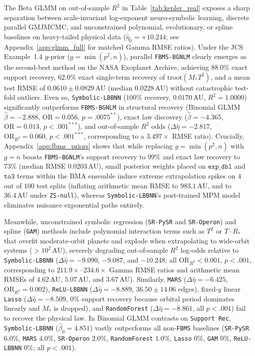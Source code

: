 \documentclass[11pt,a4paper]{article}
\begin{document}
The Beta GLMM on out-of-sample $R^2$ in Table~\ref{tab:kepler_real} exposes a sharp separation between scale-invariant log-exponent neuro-symbolic learning, discrete parallel GMJMCMC, and unconstrained polynomial, evolutionary, or spline baselines on heavy-tailed physical data ($\hat{\eta}_0 = +10.244$; see Appendix~\ref{app:glmm_full} for matched Gamma RMSE ratios). Under the JCS Example~1.4 $g$-prior ($g = \min(p^2, n)$), parallel \texttt{FBMS-BGNLM} clearly emerges as the second-best method on the NASA Exoplanet Archive, achieving $88.0\%$ exact support recovery, $62.0\%$ exact single-term recovery of $\mathrm{troot}(M_* T^2)$, and a mean test RMSE of $0.0610 \pm 0.0829\,\text{AU}$ (median $0.0228\,\text{AU}$) without catastrophic test-fold outliers. Even so, \texttt{Symbolic-LBBNN} ($100\%$ recovery, $0.0170\,\text{AU}$, $R^2 = 1.0000$) significantly outperforms \texttt{FBMS-BGNLM} in structural recovery (Binomial GLMM $\hat{\beta} = -2.888$, $\mathrm{OR} = 0.056$, $p = .0075^{**}$), exact law discovery ($\hat{\beta} = -4.365$, $\mathrm{OR} = 0.013$, $p < .001^{***}$), and out-of-sample $R^2$ odds ($\Delta\hat{\eta} = -2.817$, $\mathrm{OR}_{R^2} = 0.060$, $p < .001^{***}$, corresponding to a $3.497\times$ RMSE ratio). Crucially, Appendix~\ref{app:fbms_priors} shows that while replacing $g = \min(p^2, n)$ with $g = n$ boosts \texttt{FBMS-BGNLM}'s support recovery to $99\%$ and exact law recovery to $73\%$ (median RMSE $0.0203\,\text{AU}$), small posterior weights placed on $\texttt{exp\_dbl}$ and $\texttt{to3}$ terms within the BMA ensemble induce extreme extrapolation spikes on $4$ out of $100$ test splits (inflating arithmetic mean RMSE to $983.1\,\text{AU}$, and to $36.4\,\text{AU}$ under \texttt{ZS-null}), whereas \texttt{Symbolic-LBBNN}'s post-trained MPM model eliminates nuisance exponential paths entirely.

Meanwhile, unconstrained symbolic regression (\texttt{SR-PySR} and \texttt{SR-Operon}) and spline (\texttt{GAM}) methods include polynomial interaction terms such as $T^2$ or $T \cdot R_*$ that overfit moderate-orbit planets and explode when extrapolating to wide-orbit systems ($> 10^2\,\text{AU}$), severely degrading out-of-sample $R^2$ log-odds relative to \texttt{Symbolic-LBBNN} ($\Delta\hat{\eta} = -9.090$, $-9.087$, and $-10.248$; all $\mathrm{OR}_{R^2} < 0.001$, $p < .001$, corresponding to $211.9\times\text{--}234.6\times$ Gamma RMSE ratios and arithmetic mean RMSEs of $4.62\,\text{AU}$, $5.07\,\text{AU}$, and $3.67\,\text{AU}$). Similarly, \texttt{MARS} ($\Delta\hat{\eta} = -6.425$, $\mathrm{OR}_{R^2} = 0.002$), \texttt{ReLU-LBBNN} ($\Delta\hat{\eta} = -8.889$, $36.50 \pm 14.06$ edges), fixed-$y$ linear \texttt{Lasso} ($\Delta\hat{\eta} = -8.509$, $0\%$ support recovery because orbital period dominates linearly and $M_*$ is dropped), and \texttt{RandomForest} ($\Delta\hat{\eta} = -8.861$, all $p < .001$) fail to recover the physical law. In Binomial GLMM contrasts on \texttt{Support Rec}, \texttt{Symbolic-LBBNN} ($\hat{\beta}_0 = 4.851$) vastly outperforms all non-\texttt{FBMS} baselines (\texttt{SR-PySR} $6.0\%$, \texttt{MARS} $4.0\%$, \texttt{SR-Operon} $2.0\%$, \texttt{RandomForest} $1.0\%$, \texttt{Lasso} $0\%$, \texttt{GAM} $0\%$, \texttt{ReLU-LBBNN} $0\%$; all $p < .001$).
\end{document}
